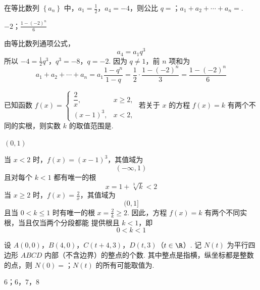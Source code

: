 \begin{problem}
在等比数列 \(\left\{a_{n}\right\}\) 中，\(a_{1}=\frac{1}{2}\)，\(a_{4}=-4\)，则公比 \(q=\)\fillinblank{}；\(a_{1}+a_{2}+\cdots+a_{n}=\)\fillinblank{}.
\end{problem}

\begin{answer}
\(-2\)；\(\frac{1-(-2)^{n}}{6}\)
\end{answer}

\begin{solution}
由等比数列通项公式，
\[
a_{4}=a_{1}q^{3}
\]
所以
\(-4=\frac{1}{2}q^{3}\)，\(q^{3}=-8\)，\(q=-2\).
因为 \(q\ne1\)，前 \(n\) 项和为
\[
a_{1}+a_{2}+\cdots+a_{n}
=a_{1}\frac{1-q^{n}}{1-q}
=\frac{1}{2}\cdot\frac{1-(-2)^{n}}{3}
=\frac{1-(-2)^{n}}{6}
\]
\end{solution}

\begin{problem}
已知函数 \(f(x) = \begin{cases}
\dfrac{2}{x}, & x \geqslant 2,\\
(x - 1)^3, & x < 2,
\end{cases}\)
若关于 \(x\) 的方程 \(f(x) = k\) 有两个不同的实根，则实数 \(k\) 的取值范围是\fillinblank{}.
\end{problem}

\begin{answer}
\((0,1)\)
\end{answer}

\begin{solution}
当 \(x<2\) 时，\(f(x)=(x-1)^{3}\)，其值域为
\[
(-\infty,1)
\]
且对每个 \(k<1\) 都有唯一的根
\[
x=1+\sqrt[3]{k}<2
\]
当 \(x\geqslant2\) 时，\(f(x)=\frac{2}{x}\)，其值域为
\[
(0,1]
\]
且当 \(0<k\leqslant1\) 时有唯一的根 \(x=\frac{2}{k}\geqslant2\).
因此，方程 \(f(x)=k\) 有两个不同实根，当且仅当两个分段都能
提供根且 \(k<1\)，即
\[
0<k<1
\]
\end{solution}

\begin{problem}
设 \(A(0,0)\)，\(B(4,0)\)，\(C(t + 4,3)\)，\(D(t,3) \)（\(t \in \R\)）. 记 \(N(t)\) 为平行四边形 \(ABCD\) 内部（不含边界）的整点的个数. 其中整点是指横，纵坐标都是整数的点，则 \(N(0) =\)\fillinblank{}；\(N(t)\) 的所有可能取值为\fillinblank{}.
\end{problem}

\begin{answer}
\(6\)；\(6\)，\(7\)，\(8\)
\end{answer}

